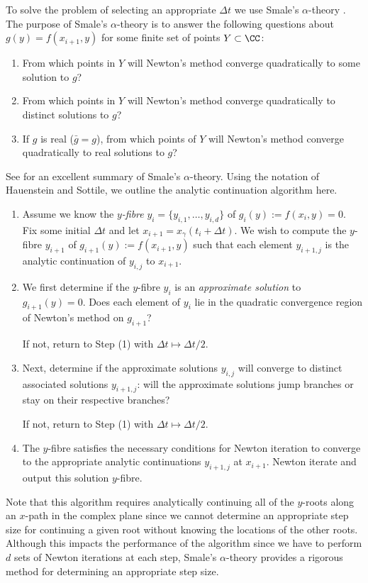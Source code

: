 To solve the problem of selecting an appropriate $\Delta t$ we use
Smale's $\alpha$-theory \cite{Smale85}. The purpose of Smale's
$\alpha$-theory is to answer the following questions about $g(y) =
f(x_{i+1},y)$ for some finite set of points $Y \subset \CC$:
\begin{enumerate}
  \item From which points in $Y$ will Newton's method converge
    quadratically to some solution to $g$?
  \item From which points in $Y$ will Newton's method converge
    quadratically to distinct solutions to $g$?
  \item If $g$ is real ($\bar{g} = g$), from which points of $Y$ will
    Newton's method converge quadratically to real solutions to $g$?
\end{enumerate}
See \cite{HauensteinSottile10} for an excellent summary of Smale's
$\alpha$-theory. Using the notation of Hauenstein and Sottile, we
outline the analytic continuation algorithm here.
\begin{enumerate}
  \item Assume we know the {\it $y$-fibre} $y_i =
    \{y_{i,1},\ldots,y_{i,d}\}$ of $g_i(y) := f(x_i,y)=0$. Fix some
    initial $\Delta t$ and let $x_{i+1} = x_\gamma(t_i + \Delta t)$. We
    wish to compute the $y$-fibre $y_{i+1}$ of $g_{i+1}(y) :=
    f(x_{i+1},y)$ such that each element $y_{i+1,j}$ is the analytic
    continuation of $y_{i,j}$ to $x_{i+1}$.
  \item We first determine if the $y$-fibre $y_i$ is an {\it approximate
    solution} to $g_{i+1}(y) = 0$. Does each element of $y_i$ lie in the
    quadratic convergence region of Newton's method on $g_{i+1}$?

    If not, return to Step (1) with $\Delta t \mapsto \Delta t / 2$.
  \item Next, determine if the approximate solutions $y_{i,j}$ will
    converge to distinct associated solutions $y_{i+1,j}$: will the
    approximate solutions jump branches or stay on their respective
    branches?

    If not, return to Step (1) with $\Delta t \mapsto \Delta t / 2$.
  \item The $y$-fibre satisfies the necessary conditions for Newton
    iteration to converge to the appropriate analytic continuations
    $y_{i+1,j}$ at $x_{i+1}$. Newton iterate and output this solution
    $y$-fibre.
\end{enumerate}

Note that this algorithm requires analytically continuing all of the
$y$-roots along an $x$-path in the complex plane since we cannot
determine an appropriate step size for continuing a given root without
knowing the locations of the other roots. Although this impacts the
performance of the algorithm since we have to perform $d$ sets of Newton
iterations at each step, Smale's $\alpha$-theory provides a rigorous
method for determining an appropriate step size.


